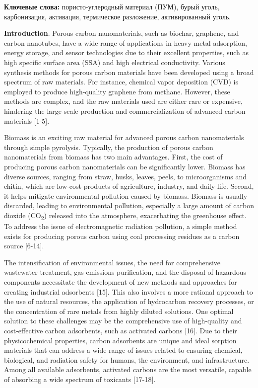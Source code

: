 {\bfseries Ключевые слова:} пористо-углеродный материал (ПУМ), бурый уголь,
карбонизация, активация, термическое разложение, активированный уголь.

{\bfseries Introduction}. Porous carbon nanomaterials, such as biochar,
graphene, and carbon nanotubes, have a wide range of applications in
heavy metal adsorption, energy storage, and sensor technologies due to
their excellent properties, such as high specific surface area (SSA) and
high electrical conductivity. Various synthesis methods for porous
carbon materials have been developed using a broad spectrum of raw
materials. For instance, chemical vapor deposition (CVD) is employed to
produce high-quality graphene from methane. However, these methods are
complex, and the raw materials used are either rare or expensive,
hindering the large-scale production and commercialization of advanced
carbon materials {[}1-5{]}.

Biomass is an exciting raw material for advanced porous carbon
nanomaterials through simple pyrolysis. Typically, the production of
porous carbon nanomaterials from biomass has two main advantages. First,
the cost of producing porous carbon nanomaterials can be significantly
lower. Biomass has diverse sources, ranging from straw, husks, leaves,
peels, to microorganisms and chitin, which are low-cost products of
agriculture, industry, and daily life. Second, it helps mitigate
environmental pollution caused by biomass. Biomass is usually discarded,
leading to environmental pollution, especially a large amount of carbon
dioxide (CO\textsubscript{2}) released into the atmosphere, exacerbating
the greenhouse effect. To address the issue of electromagnetic radiation
pollution, a simple method exists for producing porous carbon using coal
processing residues as a carbon source {[}6-14{]}.

The intensification of environmental issues, the need for comprehensive
wastewater treatment, gas emissions purification, and the disposal of
hazardous components necessitate the development of new methods and
approaches for creating industrial adsorbents {[}15{]}. This also
involves a more rational approach to the use of natural resources, the
application of hydrocarbon recovery processes, or the concentration of
rare metals from highly diluted solutions. One optimal solution to these
challenges may be the comprehensive use of high-quality and
cost-effective carbon adsorbents, such as activated carbons {[}16{]}.
Due to their physicochemical properties, carbon adsorbents are unique
and ideal sorption materials that can address a wide range of issues
related to ensuring chemical, biological, and radiation safety for
humans, the environment, and infrastructure. Among all available
adsorbents, activated carbons are the most versatile, capable of
absorbing a wide spectrum of toxicants {[}17-18{]}.

